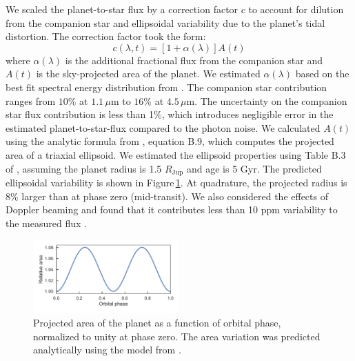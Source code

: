 \documentclass[twocolumn]{aastex61}
\begin{document}
We scaled the planet-to-star flux by a correction factor $c$ to account for dilution from the companion star and ellipsoidal variability due to the planet's tidal distortion. The correction factor took the form: 
\begin{equation}
	c(\lambda, t) = [1 + \alpha(\lambda)]A(t)
\end{equation}
where $\alpha(\lambda)$ is the additional fractional flux from the companion star and $A(t)$ is the sky-projected area of the planet. We estimated $\alpha(\lambda)$ based on the best fit spectral energy distribution from \cite{cartier17}. The companion star contribution ranges from $10\%$ at $1.1\,\mu$m to $16\%$ at $4.5\,\mu$m. The uncertainty on the companion star flux contribution is less than 1\%, which introduces negligible error in the estimated planet-to-star-flux compared to the photon noise.   We calculated $A(t)$ using the analytic formula from \cite{leconte11b}, equation B.9, which computes the projected area of a triaxial ellipsoid. We estimated the ellipsoid properties using Table B.3 of \cite{leconte11a}, assuming the planet radius is 1.5 $R_\mathrm{Jup}$ and age is 5 Gyr. The predicted ellipsoidal variability is shown in Figure\,\ref{fig:ellipsoidal}. At quadrature, the projected radius is $8\%$ larger than at phase zero (mid-transit). We also considered the effects of Doppler beaming and found that it contributes less than 10 ppm variability to the measured flux \citep{loeb03}.

\begin{figure}
\includegraphics[width = 0.5\textwidth]{Figures/ellipsoidal.pdf}
\caption{Projected area of the planet as a function of orbital phase, normalized to unity at phase zero. The area variation was predicted analytically using the model from \cite{leconte11b}.}
\label{fig:ellipsoidal}
\end{figure}
\end{document}
